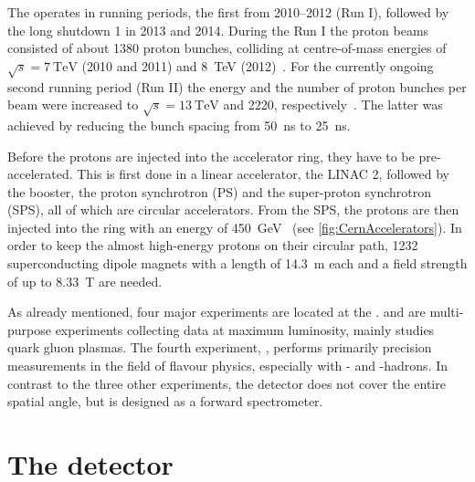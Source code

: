 The \lhc operates in running periods, the first from \numrange{2010}{2012} (Run I), followed by the long shutdown 1 in \num{2013} and \num{2014}.
During the Run I the proton beams consisted of about \num{1380} proton bunches, colliding at centre-of-mass energies of $\sqrt{s}=\SI{7}{\tera\electronvolt}$ (\num{2010} and \num{2011}) and \SI{8}{\tera\electronvolt} (\num{2012})~\cite{LHC_statistic}.
For the currently ongoing second running period (Run II) the energy and the number of proton bunches per beam were increased to $\sqrt{s}=\SI{13}{\tera\electronvolt}$ and \num{2220}, respectively~\cite{LHC_statistic}.
The latter was achieved by reducing the bunch spacing from \SI{50}{\nano\second} to \SI{25}{\nano\second}.

Before the protons are injected into the \lhc accelerator ring, they have to be pre-accelerated.
This is first done in a linear accelerator, the LINAC 2, followed by the booster, the proton synchrotron (PS) and the super-proton synchrotron (SPS), all of which are circular accelerators.
From the SPS, the protons are then injected into the \lhc ring with an energy of \SI{450}{\giga\electronvolt}~\cite{Bruening:782076} (see \cref{fig:CernAccelerators}).
In order to keep the almost high-energy protons on their circular path, \num{1232} superconducting dipole magnets with a length of \SI{14.3}{\metre} each and a field strength of up to \SI{8.33}{\tesla} are needed.

As already mentioned, four major experiments are located at the \lhc.
\atlas and \cms are multi-purpose experiments collecting data at maximum luminosity, \alice mainly studies quark gluon plasmas.
The fourth experiment, \lhcb, performs primarily precision measurements in the field of flavour physics, especially with \bquark- and \cquark-hadrons.
In contrast to the three other experiments, the detector does not cover the entire spatial angle, but is designed as a forward spectrometer.

\section{The \lhcb detector}

